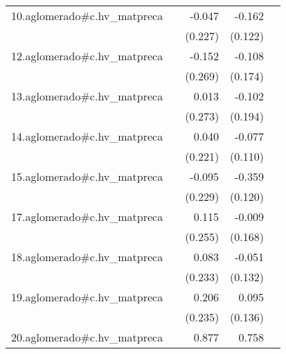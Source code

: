 {\begin{longtable}{l*{4}{D{.}{.}{-1}}}
\addlinespace
10.aglomerado#c.hv\_matpreca&                     &      -0.047         &      -0.162         &                     \\
            &                     &     (0.227)         &     (0.122)         &                     \\
\addlinespace
12.aglomerado#c.hv\_matpreca&                     &      -0.152         &      -0.108         &                     \\
            &                     &     (0.269)         &     (0.174)         &                     \\
\addlinespace
13.aglomerado#c.hv\_matpreca&                     &       0.013         &      -0.102         &                     \\
            &                     &     (0.273)         &     (0.194)         &                     \\
\addlinespace
14.aglomerado#c.hv\_matpreca&                     &       0.040         &      -0.077         &                     \\
            &                     &     (0.221)         &     (0.110)         &                     \\
\addlinespace
15.aglomerado#c.hv\_matpreca&                     &      -0.095         &      -0.359\sym{**} &                     \\
            &                     &     (0.229)         &     (0.120)         &                     \\
\addlinespace
17.aglomerado#c.hv\_matpreca&                     &       0.115         &      -0.009         &                     \\
            &                     &     (0.255)         &     (0.168)         &                     \\
\addlinespace
18.aglomerado#c.hv\_matpreca&                     &       0.083         &      -0.051         &                     \\
            &                     &     (0.233)         &     (0.132)         &                     \\
\addlinespace
19.aglomerado#c.hv\_matpreca&                     &       0.206         &       0.095         &                     \\
            &                     &     (0.235)         &     (0.136)         &                     \\
\addlinespace
20.aglomerado#c.hv\_matpreca&                     &       0.877         &       0.758         &                     \\

\end{longtable}}

